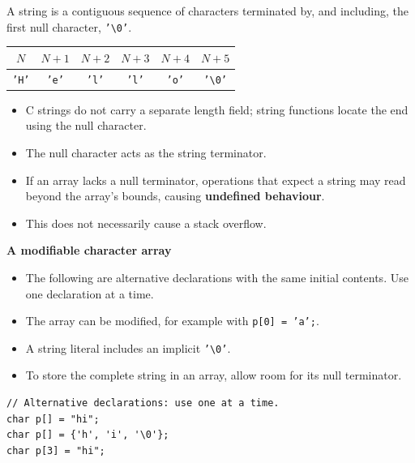 \documentclass[11pt,a4paper]{article}
\begin{document}


A string is a contiguous sequence of characters terminated by,
and including, the first null character, \texttt{'\textbackslash0'}.

\begin{center}
\begin{tabular}{@{}*{6}{c}@{}}
\toprule
\(N\) & \(N+1\) & \(N+2\) & \(N+3\) & \(N+4\) & \(N+5\) \\
\midrule
\texttt{'H'} &
\texttt{'e'} &
\texttt{'l'} &
\texttt{'l'} &
\texttt{'o'} &
\texttt{'\textbackslash0'} \\
\bottomrule
\end{tabular}
\end{center}

\begin{itemize}
    \item C strings do not carry a separate length field;
          string functions locate the end using the null character.
    \item The null character acts as the string terminator.
    \item If an array lacks a null terminator, operations that
          expect a string may read beyond the array's bounds,
          causing \textbf{undefined behaviour}.
    \item This does not necessarily cause a stack overflow.
\end{itemize}


\textbf{A modifiable character array}

\begin{itemize}
    \item The following are alternative declarations with the same
          initial contents. Use one declaration at a time.
    \item The array can be modified, for example with
          \texttt{p[0] = 'a';}.
    \item A string literal includes an implicit
          \texttt{'\textbackslash0'}.
    \item To store the complete string in an array, allow room
          for its null terminator.
\end{itemize}

\begin{lstlisting}[style=cscode]
// Alternative declarations: use one at a time.
char p[] = "hi";
char p[] = {'h', 'i', '\0'};
char p[3] = "hi";
\end{lstlisting}
\end{document}
